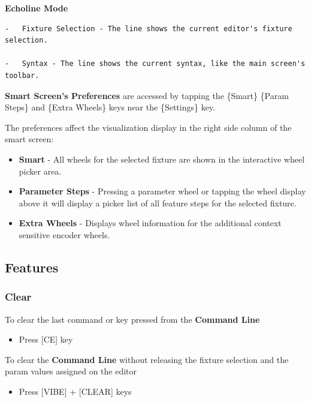 \documentclass[
]{article}
\providecommand{\tightlist}{%
  \setlength{\itemsep}{0pt}\setlength{\parskip}{0pt}}
\begin{document}
\textbf{Echoline Mode}

\begin{verbatim}
-   Fixture Selection - The line shows the current editor's fixture selection.

-   Syntax - The line shows the current syntax, like the main screen's toolbar.
\end{verbatim}

\textbf{Smart Screen's Preferences} are accessed by tapping the \{Smart\} \{Param Steps\} and \{Extra Wheels\} keys near the \{Settings\} key.

The preferences affect the visualization display in the right side column of the smart screen:

\begin{itemize}
\item
  \textbf{Smart} - All wheels for the selected fixture are shown in the interactive wheel picker area.
\item
  \textbf{Parameter Steps} - Pressing a parameter wheel or tapping the wheel display above it will display a picker list of all feature steps for the selected fixture.
\item
  \textbf{Extra Wheels} - Displays wheel information for the additional context sensitive encoder wheels.
\end{itemize}

\hypertarget{Features-7.3}{%
\subsection{Features}\label{Features-7.3}}

\hypertarget{clear}{%
\subsubsection{Clear}\label{clear}}

To clear the last command or key pressed from the \textbf{Command Line}

\begin{itemize}
\tightlist
\item
  Press {[}CE{]} key
\end{itemize}

To clear the \textbf{Command Line} without releasing the fixture selection and the param values assigned on the editor

\begin{itemize}
\tightlist
\item
  Press {[}VIBE{]} + {[}CLEAR{]} keys
\end{itemize}
\end{document}
